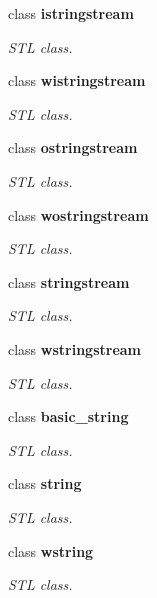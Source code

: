 \begin{CompactItemize}
class \textbf{istringstream}
\begin{CompactList}\small\item\em STL class. \item\end{CompactList}\item 
class \textbf{wistringstream}
\begin{CompactList}\small\item\em STL class. \item\end{CompactList}\item 
class \textbf{ostringstream}
\begin{CompactList}\small\item\em STL class. \item\end{CompactList}\item 
class \textbf{wostringstream}
\begin{CompactList}\small\item\em STL class. \item\end{CompactList}\item 
class \textbf{stringstream}
\begin{CompactList}\small\item\em STL class. \item\end{CompactList}\item 
class \textbf{wstringstream}
\begin{CompactList}\small\item\em STL class. \item\end{CompactList}\item 
class \textbf{basic\_\-string}
\begin{CompactList}\small\item\em STL class. \item\end{CompactList}\item 
class \textbf{string}
\begin{CompactList}\small\item\em STL class. \item\end{CompactList}\item 
class \textbf{wstring}
\begin{CompactList}\small\item\em STL class. \item\end{CompactList}\item 

\end{CompactItemize}
